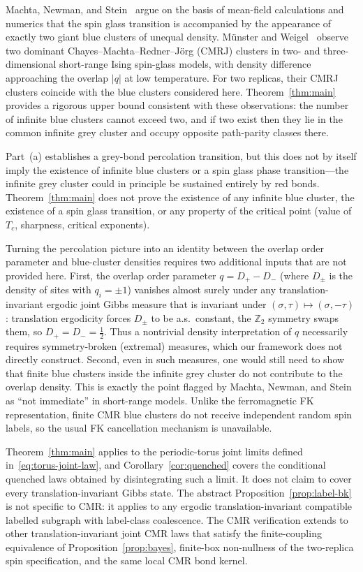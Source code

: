 \documentclass[11pt]{article}
\numberwithin{theorem}{section}
\theoremstyle{remark}
\begin{document}
Machta, Newman, and Stein~\cite{MNS2007} argue on the basis of mean-field calculations and numerics that the spin glass transition is accompanied by the appearance of exactly two giant blue clusters of unequal density.
M\"unster and Weigel~\cite{MW2023,MW2025} observe two dominant Chayes--Machta--Redner--J\"org (CMRJ) clusters in two- and three-dimensional short-range Ising spin-glass models, with density difference approaching the overlap $|q|$ at low temperature.
For two replicas, their CMRJ clusters coincide with the blue clusters considered here.
Theorem~\ref{thm:main} provides a rigorous upper bound consistent with these observations: the number of infinite blue clusters cannot exceed two, and if two exist then they lie in the common infinite grey cluster and occupy opposite path-parity classes there.

Part~(a) establishes a grey-bond percolation transition, but this does not by itself imply the existence of infinite blue clusters or a spin glass phase transition---the infinite grey cluster could in principle be sustained entirely by red bonds.
Theorem~\ref{thm:main} does not prove the existence of any infinite blue cluster, the existence of a spin glass transition, or any property of the critical point (value of $T_c$, sharpness, critical exponents).

Turning the percolation picture into an identity between the overlap order parameter and blue-cluster densities requires two additional inputs that are not provided here.
First, the overlap order parameter $q = D_+ - D_-$ (where $D_\pm$ is the density of sites with $q_i = \pm 1$) vanishes almost surely under any translation-invariant ergodic joint Gibbs measure that is invariant under $(\sigma, \tau) \mapsto (\sigma, -\tau)$: translation ergodicity forces $D_\pm$ to be a.s.\ constant, the $\mathbb{Z}_2$ symmetry swaps them, so $D_+ = D_- = \tfrac{1}{2}$.
Thus a nontrivial density interpretation of $q$ necessarily requires symmetry-broken (extremal) measures, which our framework does not directly construct.
Second, even in such measures, one would still need to show that finite blue clusters inside the infinite grey cluster do not contribute to the overlap density.
This is exactly the point flagged by Machta, Newman, and Stein~\cite[p.~120]{MNS2007} as ``not immediate'' in short-range models.
Unlike the ferromagnetic FK representation, finite CMR blue clusters do not receive independent random spin labels, so the usual FK cancellation mechanism is unavailable.

Theorem~\ref{thm:main} applies to the periodic-torus joint limits defined in~\eqref{eq:torus-joint-law}, and Corollary~\ref{cor:quenched} covers the conditional quenched laws obtained by disintegrating such a limit.
It does not claim to cover every translation-invariant Gibbs state.
The abstract Proposition~\ref{prop:label-bk} is not specific to CMR: it applies to any ergodic translation-invariant compatible labelled subgraph with label-class coalescence.
The CMR verification extends to other translation-invariant joint CMR laws that satisfy the finite-coupling equivalence of Proposition~\ref{prop:bayes}, finite-box non-nullness of the two-replica spin specification, and the same local CMR bond kernel.
\end{document}
